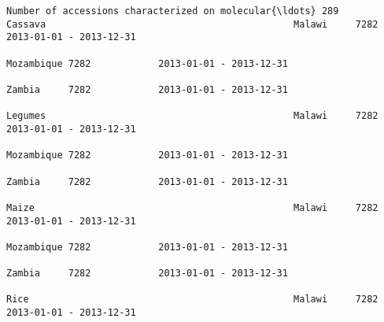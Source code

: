 \documentclass[11pt]{article}
\begin{document}
\begin{Verbatim}[commandchars=\\\{\}]
                                                                         Number of accessions characterized on molecular{\ldots} 289                               Cassava                                            Malawi     7282            2013-01-01 - 2013-12-31   
                                                                                                                                                                                                                 Mozambique 7282            2013-01-01 - 2013-12-31   
                                                                                                                                                                                                                 Zambia     7282            2013-01-01 - 2013-12-31   
                                                                                                                                                              Legumes                                            Malawi     7282            2013-01-01 - 2013-12-31   
                                                                                                                                                                                                                 Mozambique 7282            2013-01-01 - 2013-12-31   
                                                                                                                                                                                                                 Zambia     7282            2013-01-01 - 2013-12-31   
                                                                                                                                                              Maize                                              Malawi     7282            2013-01-01 - 2013-12-31   
                                                                                                                                                                                                                 Mozambique 7282            2013-01-01 - 2013-12-31   
                                                                                                                                                                                                                 Zambia     7282            2013-01-01 - 2013-12-31   
                                                                                                                                                              Rice                                               Malawi     7282            2013-01-01 - 2013-12-31   

\end{Verbatim}
\end{document}

